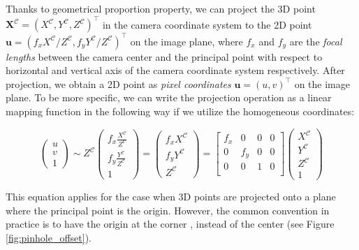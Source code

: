 \documentclass[12pt]{report}
\numberwithin{figure}{section}
\begin{document}
Thanks to geometrical proportion property, we can project the 3D point 
$\mathbf{X^{\mathcal{C}}}=(X^{\mathcal{C}}, Y^{\mathcal{C}}, 
Z^{\mathcal{C}})^\top$ in the 
camera 
coordinate system 
to 
the 2D 
point $\mathbf{u} = (f_xX^{\mathcal{C}}/Z^{\mathcal{C}}, 
f_yY^{\mathcal{C}}/Z^{\mathcal{C}})^\top$ on the 
image 
plane, where 
$f_x$ and $f_y$ are the \textit{focal lengths} between the camera center and 
the principal point with respect to horizontal and vertical axis of the camera 
coordinate system respectively.  After projection, we obtain a 2D point  
as \textit{pixel coordinates} $\mathbf{u}=(u,v)^\top$ on the image 
plane.  To 
be more specific, we can write the projection operation as a linear mapping 
function in the following way if we utilize the homogeneous coordinates:

\begin{equation}
  \begin{pmatrix}
    u\\
    v\\
    1
  \end{pmatrix}
  \sim
  Z^{\mathcal{C}}
  \begin{pmatrix}
    f_x\frac{X^{\mathcal{C}}}{Z^{\mathcal{C}}}\\
    f_y\frac{Y^{\mathcal{C}}}{Z^{\mathcal{C}}}\\
    1
  \end{pmatrix}
  =
  \begin{pmatrix}
    f_xX^{\mathcal{C}}\\
    f_yY^{\mathcal{C}}\\
    Z^{\mathcal{C}}
  \end{pmatrix}
  =
  \begin{bmatrix}
    f_x & 0 & 0 & 0\\
    0 & f_y & 0 & 0\\
    0 & 0 & 1 & 0\\
  \end{bmatrix}
  \begin{pmatrix}
    X^{\mathcal{C}}\\
    Y^{\mathcal{C}}\\
    Z^{\mathcal{C}}\\
    1
  \end{pmatrix}
\end{equation} \label{eq:proj_func_w_f}

This equation applies for the case when 3D points are projected onto a plane 
where the principal point is the origin.  However, the common convention in 
practice is to have the origin at the corner \parencite{RichardHartley2003}, 
instead of the center (see Figure \ref{fig:pinhole_offset}).
\end{document}
